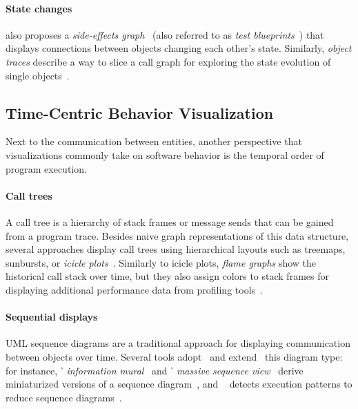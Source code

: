 \paragraph{State changes}

\Cite{lienhard2009flow} also proposes a \emph{side-effects graph}~\cite{fierz2009compass} (also referred to as \emph{test blueprints}~\cite{lienhard2008test}) that displays connections between objects changing each other's state.
Similarly, \emph{object traces} describe a way to slice a call graph for exploring the state evolution of single objects~\cite{thiede2023object,thiede2023time}.

\subsection{Time-Centric Behavior Visualization}

Next to the communication between entities, another perspective that visualizations commonly take on software behavior is the temporal order of program execution.

\paragraph{Call trees}

A call tree is a hierarchy of stack frames or message sends that can be gained from a program trace.
Besides naive graph representations of this data structure, several approaches display call trees using hierarchical layouts such as treemaps, sunbursts, or \emph{icicle plots}~\cite{kruskal1983icicle,trumper2012viewfusion,woodburn2019interactive}.
Similarly to icicle plots, \emph{flame graphs} show the historical call stack over time, but they also assign colors to stack frames for displaying additional performance data from profiling tools~\cite{gregg2016flame}.

\paragraph{Sequential displays}

UML sequence diagrams are a traditional approach for displaying communication between objects over time.
Several tools adopt~\cite{systä2001shimba} and extend~\cite{hamouLhadj2004survey} this diagram type: for instance, ' \emph{information mural}~\cite{jerding1998information} and ' \emph{massive sequence view}~\cite{cornelissen2009trace} derive miniaturized versions of a sequence diagram~\cite[sec. 3.4]{lemieux2006visualization}, and ~\cite{dePauw1998execution} detects execution patterns to reduce sequence diagrams~\cite{hamouLhadj2004survey}.

